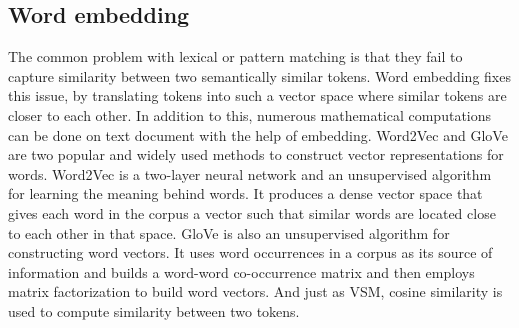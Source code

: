 \documentclass[sigconf]{acmart}
\begin{document}
\subsection{Word embedding}
The common problem with lexical or pattern matching is that they fail to capture similarity between two semantically similar tokens. Word embedding fixes this issue, by translating tokens into such a vector space where similar tokens are closer to each other. In addition to this, numerous mathematical computations can be done on text document with the help of embedding. Word2Vec \cite{word2vec} and GloVe \cite{pennington-etal-2014-glove} are two popular and widely used methods to construct vector representations for words. Word2Vec is a two-layer neural network and an unsupervised algorithm for learning the meaning behind words. It produces a dense vector space that gives each word in the corpus a vector such that similar words are located close to each other in that space. GloVe is also an unsupervised algorithm for constructing word vectors. It uses word occurrences in a corpus as its source of information and
builds a word-word co-occurrence matrix and then employs matrix factorization to build word vectors. And just as VSM, cosine similarity is used to compute similarity between two tokens.
\end{document}

